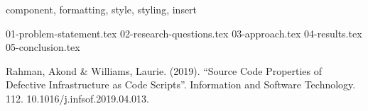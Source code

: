 \documentclass[conference]{IEEEtran}
\begin{document}
\begin{IEEEkeywords}
    component, formatting, style, styling, insert
\end{IEEEkeywords}


{01-problem-statement.tex}
{02-research-questions.tex}
{03-approach.tex}
{04-results.tex}
{05-conclusion.tex}



\begin{thebibliography}{00}
     Rahman, Akond \& Williams, Laurie. (2019). ``Source Code Properties of Defective Infrastructure as Code Scripts''. Information and Software Technology. 112. 10.1016/j.infsof.2019.04.013.
\end{thebibliography}
\end{document}
